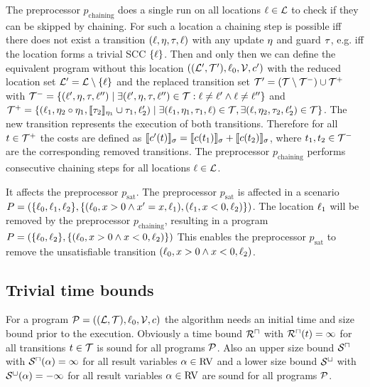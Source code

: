 The preprocessor $p_{\text{chaining}}$ does a single run on all locations $\ell \in \mathcal{L}$ to check if they can be skipped by chaining.
For such a location a chaining step is possible iff there does not exist a transition $(\ell,\eta,\tau,\ell)$ with any update $\eta$ and guard $\tau$, e.g. iff the location forms a trivial SCC $\lbrace \ell \rbrace$.
Then and only then we can define the equivalent program without this location $((\mathcal{L}', \mathcal{T}'), \ell_0, \mathcal{V}, c')$ with the reduced location set $\mathcal{L}' = \mathcal{L} \setminus \lbrace \ell \rbrace$ and the replaced transition set $\mathcal{T}' = (\mathcal{T} \setminus \mathcal{T}^-) \cup \mathcal{T}^+$ with $\mathcal{T}^- = \lbrace (\ell',\eta,\tau,\ell'') \mid \exists (\ell',\eta,\tau,\ell'') \in \mathcal{T}: \ell \neq \ell' \wedge \ell \neq \ell'' \rbrace$ and $\mathcal{T}^+ = \lbrace (\ell_1,\eta_2 \circ \eta_1,\llbracket \tau_2 \rrbracket_{\eta_1} \cup \tau_1,\ell_2') \mid \exists (\ell_1,\eta_1,\tau_1,\ell) \in \mathcal{T}, \exists (\ell,\eta_2,\tau_2,\ell_2') \in \mathcal{T} \rbrace$. 
The new transition represents the execution of both transitions.
Therefore for all $t \in \mathcal{T}^+$ the costs are defined as $\llbracket c'(t) \rrbracket_{\sigma} = \llbracket c(t_1) \rrbracket_{\sigma} + \llbracket c(t_2) \rrbracket_{\sigma}$, where $t_1, t_2 \in \mathcal{T}^-$ are the corresponding removed transitions.
The preprocessor $p_{\text{chaining}}$ performs consecutive chaining steps for all locations $\ell \in \mathcal{L}$.

It affects the preprocessor $p_{\text{sat}}$.
The preprocessor $p_{\text{sat}}$ is affected in a scenario $P = (\lbrace \ell_0, \ell_1, \ell_2 \rbrace, \lbrace (\ell_0,x>0 \wedge x'=x,\ell_1), (\ell_1,x<0,\ell_2) \rbrace)$.
The location $\ell_1$ will be removed by the preprocessor $p_{\text{chaining}}$, resulting in a program $P = (\lbrace \ell_0, \ell_2 \rbrace, \lbrace (\ell_0,x>0 \wedge x<0,\ell_2) \rbrace)$
This enables the preprocessor $p_{\text{sat}}$ to remove the unsatisfiable transition $(\ell_0,x>0 \wedge x<0,\ell_2)$.


\subsection{Trivial time bounds}

For a program $\mathcal{P} = ((\mathcal{L}, \mathcal{T}), \ell_0, \mathcal{V}, c)$ the algorithm needs an initial time and size bound prior to the execution.
Obviously a time bound ${\mathcal{R}^\sqcap}$ with ${\mathcal{R}^\sqcap}(t) = \infty$ for all transitions $t \in \mathcal{T}$ is sound for all programs $\mathcal{P}$.
Also an upper size bound ${\mathcal{S}^\sqcap}$ with ${\mathcal{S}^\sqcap}(\alpha) = \infty$ for all result variables $\alpha \in \text{RV}$ and a lower size bound ${\mathcal{S}^\sqcup}$ with ${\mathcal{S}^\sqcup}(\alpha) = -\infty$ for all result variables $\alpha \in \text{RV}$ are sound for all programs $\mathcal{P}$.

